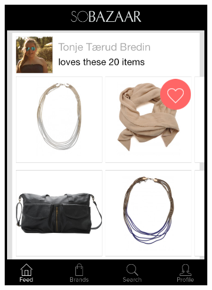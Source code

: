 \begin{figure}[H]
		\begin{subfigure}[b]{.45\linewidth}
			\centering
	  	\includegraphics[scale=0.25]{image/SoBazaarfeed2.png}
		\end{subfigure}
		\begin{subfigure}[b]{.45\linewidth}
			\centering

\end{subfigure}
\end{figure}
